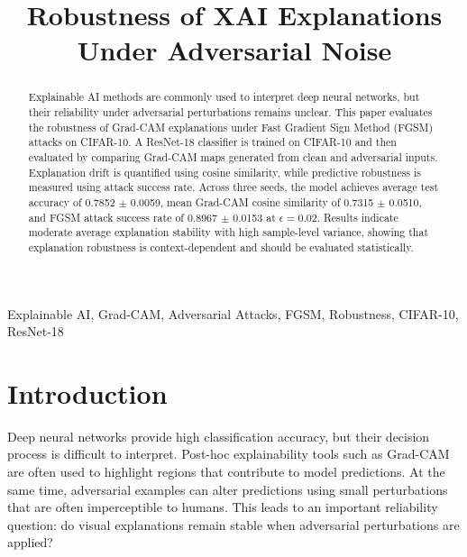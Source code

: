 \documentclass[conference]{IEEEtran}
\begin{document}
\title{Robustness of XAI Explanations Under Adversarial Noise}

\author{
}

\maketitle

\begin{abstract}
Explainable AI methods are commonly used to interpret deep neural networks, but their reliability under adversarial perturbations remains unclear. This paper evaluates the robustness of Grad-CAM explanations under Fast Gradient Sign Method (FGSM) attacks on CIFAR-10. A ResNet-18 classifier is trained on CIFAR-10 and then evaluated by comparing Grad-CAM maps generated from clean and adversarial inputs. Explanation drift is quantified using cosine similarity, while predictive robustness is measured using attack success rate. Across three seeds, the model achieves average test accuracy of 0.7852 $\pm$ 0.0059, mean Grad-CAM cosine similarity of 0.7315 $\pm$ 0.0510, and FGSM attack success rate of 0.8967 $\pm$ 0.0153 at $\epsilon=0.02$. Results indicate moderate average explanation stability with high sample-level variance, showing that explanation robustness is context-dependent and should be evaluated statistically.
\end{abstract}

\begin{IEEEkeywords}
Explainable AI, Grad-CAM, Adversarial Attacks, FGSM, Robustness, CIFAR-10, ResNet-18
\end{IEEEkeywords}

\section{Introduction}
Deep neural networks provide high classification accuracy, but their decision process is difficult to interpret. Post-hoc explainability tools such as Grad-CAM are often used to highlight regions that contribute to model predictions. At the same time, adversarial examples can alter predictions using small perturbations that are often imperceptible to humans. This leads to an important reliability question: do visual explanations remain stable when adversarial perturbations are applied?
\end{document}
